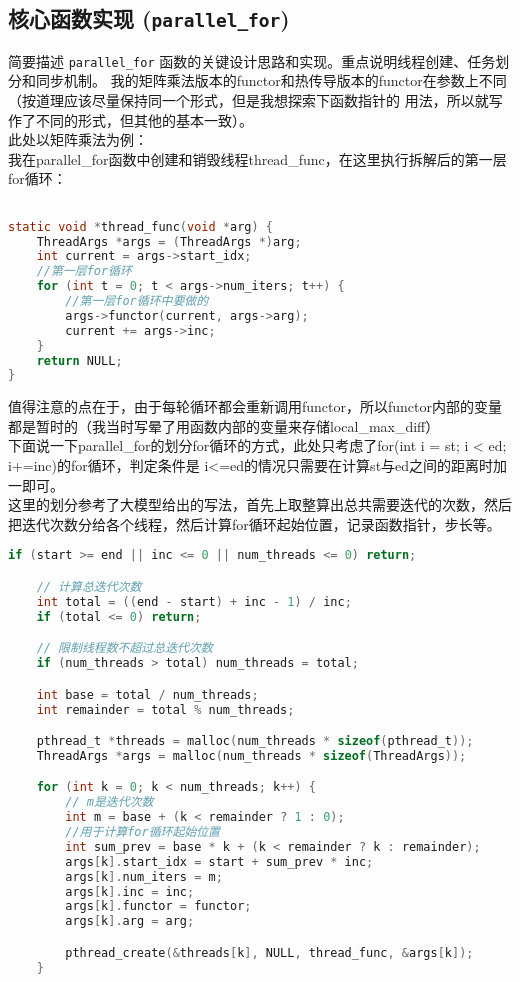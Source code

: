 \documentclass{SYSUReport}
\begin{document}
\subsection{核心函数实现 (\texttt{parallel\_for})}
简要描述 \texttt{parallel\_for} 函数的关键设计思路和实现。重点说明线程创建、任务划分和同步机制。
我的矩阵乘法版本的functor和热传导版本的functor在参数上不同（按道理应该尽量保持同一个形式，但是我想探索下函数指针的
用法，所以就写作了不同的形式，但其他的基本一致）。\\
此处以矩阵乘法为例：\\
我在parallel\_for函数中创建和销毁线程thread\_func，在这里执行拆解后的第一层for循环：
\begin{lstlisting}[language=C, caption={parallel\_for 函数核心代码片段}]

static void *thread_func(void *arg) {
    ThreadArgs *args = (ThreadArgs *)arg;
    int current = args->start_idx;
    //第一层for循环
    for (int t = 0; t < args->num_iters; t++) {
        //第一层for循环中要做的
        args->functor(current, args->arg);
        current += args->inc;
    }
    return NULL;
}
\end{lstlisting}
值得注意的点在于，由于每轮循环都会重新调用functor，所以functor内部的变量都是暂时的（我当时写晕了用函数内部的变量来存储local\_max\_diff）\\
下面说一下parallel\_for的划分for循环的方式，此处只考虑了for(int i = st; i < ed; i+=inc)的for循环，判定条件是
i<=ed的情况只需要在计算st与ed之间的距离时加一即可。\\
这里的划分参考了大模型给出的写法，首先上取整算出总共需要迭代的次数，然后把迭代次数分给各个线程，然后计算for循环起始位置，记录函数指针，步长等。
\begin{lstlisting}[language=C, caption={parallel\_for 函数核心代码片段}]
if (start >= end || inc <= 0 || num_threads <= 0) return;

    // 计算总迭代次数
    int total = ((end - start) + inc - 1) / inc;
    if (total <= 0) return;

    // 限制线程数不超过总迭代次数
    if (num_threads > total) num_threads = total;

    int base = total / num_threads;
    int remainder = total % num_threads;

    pthread_t *threads = malloc(num_threads * sizeof(pthread_t));
    ThreadArgs *args = malloc(num_threads * sizeof(ThreadArgs));

    for (int k = 0; k < num_threads; k++) {
        // m是迭代次数
        int m = base + (k < remainder ? 1 : 0);
        //用于计算for循环起始位置
        int sum_prev = base * k + (k < remainder ? k : remainder);
        args[k].start_idx = start + sum_prev * inc;
        args[k].num_iters = m;
        args[k].inc = inc;
        args[k].functor = functor;
        args[k].arg = arg;

        pthread_create(&threads[k], NULL, thread_func, &args[k]);
    }
\end{lstlisting}
\end{document}
